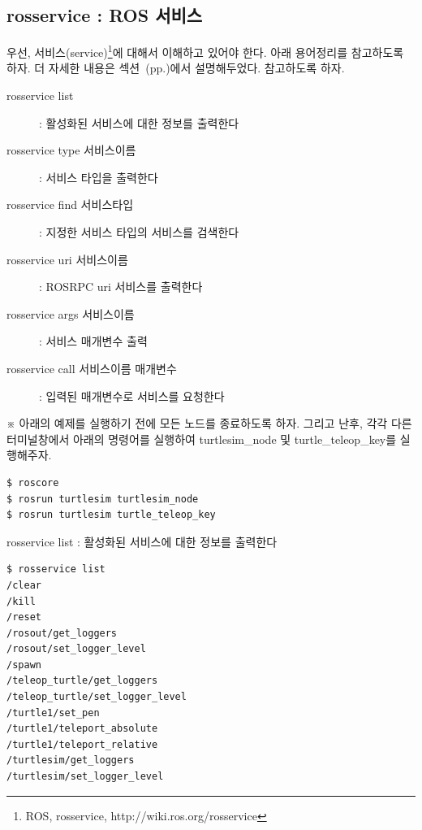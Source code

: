 \newpage
\subsection{rosservice : ROS 서비스}

우선, 서비스(service)\footnote{ROS, rosservice, http://wiki.ros.org/rosservice}에 대해서 이해하고 있어야 한다. 아래 용어정리를 참고하도록 하자. 더 자세한 내용은 섹션~(pp.\pageref{def:RosService})에서 설명해두었다. 참고하도록 하자.

\vspace{\baselineskip}
\noindent
\begin{description}
\item[rosservice list] : 활성화된 서비스에 대한 정보를 출력한다
\item[rosservice type 서비스이름] : 서비스 타입을 출력한다
\item[rosservice find 서비스타입] : 지정한 서비스 타입의 서비스를 검색한다
\item[rosservice uri  서비스이름] : ROSRPC uri 서비스를 출력한다
\item[rosservice args 서비스이름] : 서비스 매개변수 출력
\item[rosservice call 서비스이름 매개변수] : 입력된 매개변수로 서비스를 요청한다
\end{description}

\vspace{\baselineskip}
\noindent
※ 아래의 예제를 실행하기 전에 모든 노드를 종료하도록 하자. 그리고 난후, 각각 다른 터미널창에서 아래의 명령어를 실행하여 turtlesim\_node 및 turtle\_teleop\_key를 실행해주자.

\begin{lstlisting}[language=ROS]
$ roscore
$ rosrun turtlesim turtlesim_node 
$ rosrun turtlesim turtle_teleop_key
\end{lstlisting}

\setcounter{num}{0}

\vspace{\baselineskip}
\noindent
{}\circled{\thenum} rosservice list : 활성화된 서비스에 대한 정보를 출력한다

\begin{lstlisting}[language=ROS]
$ rosservice list
/clear
/kill
/reset
/rosout/get_loggers
/rosout/set_logger_level
/spawn
/teleop_turtle/get_loggers
/teleop_turtle/set_logger_level
/turtle1/set_pen
/turtle1/teleport_absolute
/turtle1/teleport_relative
/turtlesim/get_loggers
/turtlesim/set_logger_level
\end{lstlisting}

